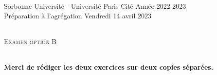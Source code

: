 \documentclass[11pt]{article}
\date{}
\author{}
\theoremstyle{exostyle}
\begin{document}


\noindent 
Sorbonne Universit\'e - Université Paris Cité     \hfill   Ann\'ee 2022-2023 \\
Pr\'eparation \`a  l'agr\'egation        \hfill     Vendredi 14 avril 2023 \\ %
\noindent {\rule{\textwidth}{.2mm}}\\[-5mm]
\begin{center}
{\large \textsc{Examen option B} }\\[-5mm]
\end{center}
\noindent {\rule{\textwidth}{.2mm}}\\[1cm]


{\bfseries Merci de r\'ediger les deux exercices sur deux copies s\'epar\'ees.}
\end{document}
